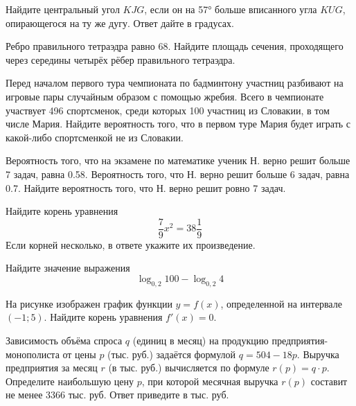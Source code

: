 \documentclass[twocolumn]{article}
\begin{document}
\begin{taskBN}{1}
Найдите центральный угол $KJG$, если он на 57° больше вписанного угла $KUG$, опирающегося на ту же дугу. Ответ дайте в градусах.
\end{taskBN}

\begin{taskBN}{2}
Ребро правильного тетраэдра равно 68. Найдите площадь сечения, проходящего через середины четырёх рёбер правильного тетраэдра.
\end{taskBN}

\begin{taskBN}{3}
Перед началом первого тура чемпионата по бадминтону участниц разбивают на игровые пары случайным образом с помощью жребия. Всего в чемпионате участвует 496 спортсменок, среди которых 100 участниц из Словакии, в том числе Мария. Найдите вероятность того, что в первом туре Мария будет играть с какой-либо спортсменкой не из Словакии.
\end{taskBN}

\begin{taskBN}{4}
Вероятность того, что на экзамене по математике ученик Н. верно решит больше 7 задач, равна 0.58. Вероятность того, что Н. верно решит больше 6 задач, равна 0.7. Найдите вероятность того, что Н. верно решит ровно 7 задач.
\end{taskBN}

\begin{taskBN}{5}
Найдите корень уравнения $$\frac{7}{9}x^2={38}\frac{1}{9}$$ Если корней несколько, в ответе укажите их произведение.
\end{taskBN}

\begin{taskBN}{6}
Найдите значение выражения $$\log_{0,2}{100} - \log_{0,2}{4} $$
\end{taskBN}

\begin{taskBN}{7}
На рисунке изображен график функции $y = f(x)$, определенной на интервале $(-1; 5)$. Найдите корень уравнения $f'(x)=0$.\vspace{2.5cm}
\end{taskBN}

\begin{taskBN}{8}
Зависимость объёма спроса $q$ (единиц в месяц) на продукцию предприятия-монополиста от цены $p$ (тыс. руб.) задаётся формулой $q=504-18p$. Выручка предприятия за месяц $r$ (в тыс. руб.) вычисляется по формуле $r(p)=q\cdot p$. Определите наибольшую цену $p$, при которой месячная выручка $r(p)$ составит не менее 3366 тыс. руб. Ответ приведите в тыс. руб.
\end{taskBN}
\end{document}
